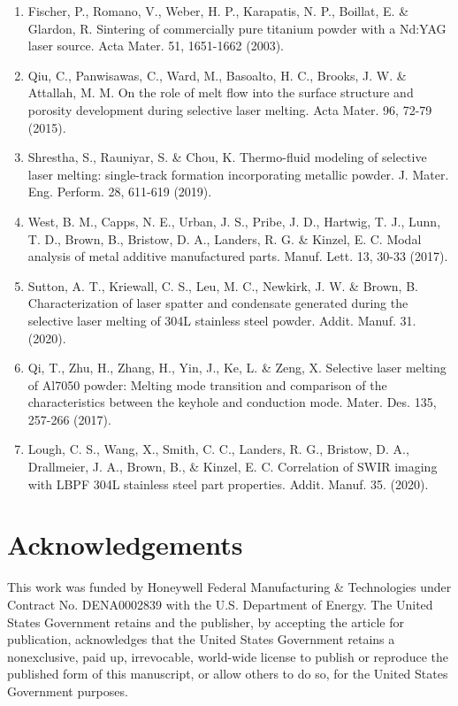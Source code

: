 \documentclass[10pt]{article}
\begin{document}
\begin{enumerate}
  \item Fischer, P., Romano, V., Weber, H. P., Karapatis, N. P., Boillat, E. \& Glardon, R. Sintering of commercially pure titanium powder with a Nd:YAG laser source. Acta Mater. 51, 1651-1662 (2003).

  \item Qiu, C., Panwisawas, C., Ward, M., Basoalto, H. C., Brooks, J. W. \& Attallah, M. M. On the role of melt flow into the surface structure and porosity development during selective laser melting. Acta Mater. 96, 72-79 (2015).

  \item Shrestha, S., Rauniyar, S. \& Chou, K. Thermo-fluid modeling of selective laser melting: single-track formation incorporating metallic powder. J. Mater. Eng. Perform. 28, 611-619 (2019).

  \item West, B. M., Capps, N. E., Urban, J. S., Pribe, J. D., Hartwig, T. J., Lunn, T. D., Brown, B., Bristow, D. A., Landers, R. G. \& Kinzel, E. C. Modal analysis of metal additive manufactured parts. Manuf. Lett. 13, 30-33 (2017).

  \item Sutton, A. T., Kriewall, C. S., Leu, M. C., Newkirk, J. W. \& Brown, B. Characterization of laser spatter and condensate generated during the selective laser melting of 304L stainless steel powder. Addit. Manuf. 31. (2020).

  \item Qi, T., Zhu, H., Zhang, H., Yin, J., Ke, L. \& Zeng, X. Selective laser melting of Al7050 powder: Melting mode transition and comparison of the characteristics between the keyhole and conduction mode. Mater. Des. 135, 257-266 (2017).

  \item Lough, C. S., Wang, X., Smith, C. C., Landers, R. G., Bristow, D. A., Drallmeier, J. A., Brown, B., \& Kinzel, E. C. Correlation of SWIR imaging with LBPF 304L stainless steel part properties. Addit. Manuf. 35. (2020).

\end{enumerate}

\section*{Acknowledgements}
This work was funded by Honeywell Federal Manufacturing \& Technologies under Contract No. DENA0002839 with the U.S. Department of Energy. The United States Government retains and the publisher, by accepting the article for publication, acknowledges that the United States Government retains a nonexclusive, paid up, irrevocable, world-wide license to publish or reproduce the published form of this manuscript, or allow others to do so, for the United States Government purposes.
\end{document}
